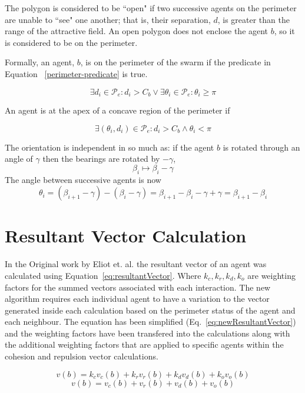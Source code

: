 \documentclass[12pt,a4paper]{article}
\begin{document}
The polygon is considered to be ``open" if two successive agents on the perimeter are unable to ``see" one another; that is, their separation, $d$, is greater than the range of the attractive field.  An open polygon does not enclose the agent $b$, so it is considered to be on the perimeter. 

Formally, an agent, $b$, is on the perimeter of the swarm if the predicate in Equation ~\ref{perimeter-predicate} is true.

\begin{equation}
	\exists d_i\in\mathcal{P}_e:d_i>C_b \vee
	\exists\theta_i\in\mathcal{P}_e:\theta_i\geq\pi
	\label{perimeter-predicate}
\end{equation}

An agent is at the apex of a concave region of the perimeter if

\begin{equation}
	\exists(\theta_i,d_i)\in\mathcal{P}_e : d_i>C_b\wedge\theta_i<\pi
	\label{concave-predicate}
\end{equation}

The orientation is independent in so much as: if the agent $b$ is rotated through an angle of $\gamma$ then the bearings are rotated by $-\gamma$, \[ \beta_i\mapsto\beta_i-\gamma \] The  angle between successive agents is now
\[
	\theta_i  =  (\beta_{i+1}-\gamma) - (\beta_i-\gamma)
	 = \beta_{i+1}-\beta_i-\gamma+\gamma
	 = \beta_{i+1}-\beta_i
\]

\section{Resultant Vector Calculation}\label{resultantVector}
In the Original work by Eliot et. al. the resultant vector of an agent was calculated using Equation~\ref{eq:resultantVector}. Where $k_c,k_r,k_d,k_o$ are weighting factors for the summed vectors associated with each interaction. The new algorithm requires each individual agent to have a variation to the vector generated inside each calculation based on the perimeter status of the agent and each neighbour. The equation has been simplified (Eq.~\ref{eq:newResultantVector}) and the weighting factors have been transfered into the calculations along with the additional weighting factors that are applied to specific agents within the cohesion and repulsion vector calculations.

\begin{equation}\label{eq:resultantVector}
	v(b) = k_cv_c(b) + k_rv_r(b) + k_dv_d(b) + k_ov_o(b)
\end{equation}
\begin{equation}\label{eq:newResultantVector}
	v(b) = v_c(b) + v_r(b) + v_d(b) + v_o(b)
\end{equation}
\end{document}
